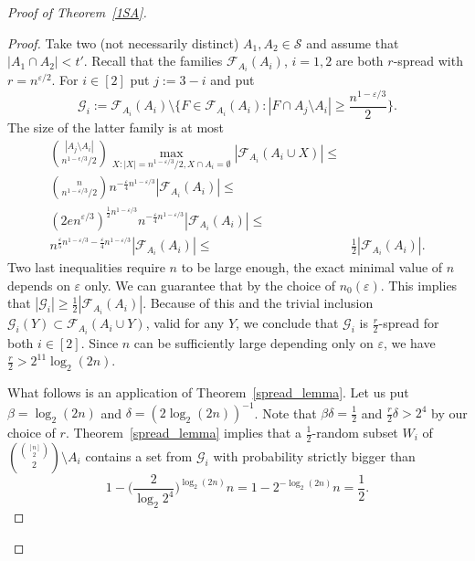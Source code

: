 \documentclass[10pt,a4paper]{amsart}
\newcommand{\eps}{\varepsilon}
\newcommand{\ff}{\mathcal{F}}
\newcommand{\g}{\mathcal{G}}
\renewcommand{\ge}{\geqslant}
\renewcommand{\le}{\leqslant}
\begin{document}
\begin{proof}[Proof of Theorem~\ref{1SA}]
\begin{proof}
  Take two (not necessarily distinct) $A_1,A_2\in \mathcal S$  and assume that $|A_1\cap A_2|<t'$. Recall that the families $\ff_{A_i}(A_i)$, $i=1,2$ are both $r$-spread with $r = n^{\eps/2}$. 
  For $i\in [2]$ put $j:=3-i$ and put
  $$\g_i:=\ff_{A_i}(A_i)\setminus\Big\{F\in \ff_{A_i}(A_i): |F\cap A_j\setminus A_i|\ge \frac{n^{1-\eps/3}}2\Big\}.$$ The size of the latter family is at most
 \begin{align*}{|A_j\setminus A_i|\choose n^{1-\epsilon/3}/2}\max_{X: |X| = n^{1-\eps/3}/2, X\cap A_i = \emptyset}|\ff_{A_i}(A_i\cup X)|\le&\\  {n\choose n^{1-\eps/3}/2}n^{-\frac\eps 4 n^{1-\eps/3}}|\ff_{A_i}(A_i)|\le&\\
  (2e n^{\eps/3})^{\frac 12n^{1-\eps/3}}n^{-\frac\eps 4 n^{1-\eps/3}}|\ff_{A_i}(A_i)|\le&\\
  n^{\frac{\eps}5n^{1 - \eps/3} - \frac{\eps}4n^{1 - \eps/3}}|\ff_{A_i}(A_i)| \le&\frac 12 |\ff_{A_i}(A_i)|.\end{align*}
  Two last inequalities require $n$ to be large enough, the exact minimal value of $n$ depends on $\eps$ only. We can guarantee that by the choice of $n_0(\eps)$. This implies that $|\g_i|\ge \frac 12 |\ff_{A_i}(A_i)|$.
 Because of this and the trivial inclusion $\g_i(Y)\subset \ff_{A_i}(A_i\cup Y)$, valid for any $Y$,  we conclude that $\g_i$ is $ \frac r2$-spread for both $i\in [2]$. Since $n$ can be sufficiently large depending only on $\eps$, we have $\frac r2 > 2^{11}\log_2(2n)$.  



  What follows is an application of Theorem~\ref{spread_lemma}. Let us put $\beta= \log_2(2n)$ and $\delta = (2\log_2(2n))^{-1}$. Note that $\beta\delta = \frac 12$ and $\frac r2\delta > 2^{4}$ by our choice of $r$.  Theorem~\ref{spread_lemma} implies that a $\frac{1}2$-random subset $W_i$ of ${{[n]\choose 2}\choose 2}\setminus A_i$ contains a set from $\g_i$ with probability strictly bigger than
  $$1-\Big(\frac 2{\log_2 2^{4}}\Big)^{\log_2 (2n)} n = 1-2^{-\log_2 (2n)} n = \frac 12.$$


\end{proof}
\end{proof}
\end{document}
